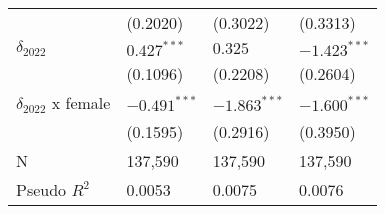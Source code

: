 \begin{tabular}{llll}
                           &           (0.2020) &           (0.3022) &           (0.3313) \\
$\delta_{2022}$            &      $0.427^{***}$ &            $0.325$ &     $-1.423^{***}$ \\
                           &           (0.1096) &           (0.2208) &           (0.2604) \\
$\delta_{2022}$ x female   &     $-0.491^{***}$ &     $-1.863^{***}$ &     $-1.600^{***}$ \\
                           &           (0.1595) &           (0.2916) &           (0.3950) \\
N                          &            137,590 &            137,590 &            137,590 \\
Pseudo $R^2$               &             0.0053 &             0.0075 &             0.0076 \\
\bottomrule
\end{tabular}
